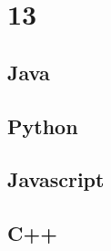 \documentclass[11pt, oneside]{article}
\begin{document}
\section*{13}

\subsection*{Java}

\subsection*{Python}
\subsection*{Javascript}

\subsection*{C++}
\end{document}
